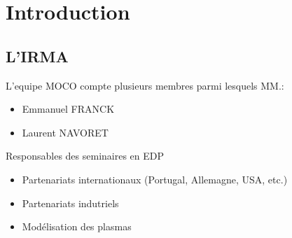 
% 




\section{Introduction}    %

\subsection{L'IRMA}
	
\begin{frame}
	L'equipe MOCO compte plusieurs membres parmi lesquels MM.: %
	\begin{itemize}
		\item Emmanuel FRANCK %
		\item Laurent NAVORET %
  \end{itemize}
  Responsables des seminaires en EDP

  \pause
	\begin{itemize}
		\item Partenariats internationaux (Portugal, Allemagne, USA, etc.)  %
		\item Partenariats indutriels  %
		\item Modélisation des plasmas  %
  \end{itemize}

\end{frame}

	

